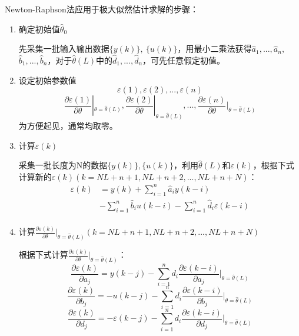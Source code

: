 \documentclass[UTF8, twocolumn]{article}
\begin{document}
Newton-Raphson法应用于极大似然估计求解的步骤：
\begin{enumerate}
    \item 确定初始值$\hat{\theta}_0$
    
    先采集一批输入输出数据$\{ y(k) \},\ \{ u(k) \}$，用最小二乘法获得$\hat{a}_1, ..., \hat{a}_n,$ $\hat{b}_1, ..., \hat{b}_n$，对于$\hat{\theta}(L)$中的$\hat{d}_1, ..., \hat{d}_n$，可先任意假定初值。

    \item 设定初始参数值
    \begin{equation*}
		\varepsilon(1), \varepsilon(2), ..., \varepsilon(n)
	\end{equation*} 
	\begin{equation*}
		\frac{\partial\varepsilon(1)}{\partial\theta}|_{\theta = \hat{\theta}(L)},\frac{\partial\varepsilon(2)}{\partial\theta}|_{\theta = \hat{\theta}(L)}, ..., \frac{\partial\varepsilon(n)}{\partial\theta}|_{\theta = \hat{\theta}(L)}
	\end{equation*} 
	为方便起见，通常均取零。
    
    \item 计算$\varepsilon(k)$
    
    采集一批长度为N的数据$\{ y(k) \}, \{ u(k) \}$，利用$\hat{\theta}(L)$和$\varepsilon(k)$，根据下式计算新的$\varepsilon(k)(k = NL + n + 1, NL + n + 2, ..., NL + n + N)$：
	\begin{align*}
		\varepsilon(k) &= y(k) + \sum_{i = 1}^n \hat{a}_iy(k - i) \\
		& - \sum_{i = 1}^n \hat{b}_iu(k - i) - \sum_{i = 1}^n \hat{d}_i\varepsilon(k - i) \\
	\end{align*}

    \item 计算$\frac{\partial \varepsilon(k)}{\partial \theta}|_{\theta = \hat{\theta}(L)}(k = NL + n + 1, NL + n + 2, ..., NL + n + N)$
    
    根据下式计算$\frac{\partial \varepsilon(k)}{\partial \theta}|_{\theta = \hat{\theta}(L)}$：
    \begin{equation*}
        \frac{\partial\varepsilon(k)}{\partial a_j} = y(k - j) - \sum_{i = 1}^n d_i \frac{\partial \varepsilon(k - i)}{\partial a_j}|_{\theta = \hat{\theta}(L)} 
    \end{equation*}
    \begin{equation*}
        \frac{\partial \varepsilon(k)}{\partial b_j} = -u(k - j) - \sum_{i = 1}^n d_i \frac{\partial \varepsilon(k - i)}{\partial b_j}|_{\theta = \hat{\theta}(L)}
    \end{equation*}
    \begin{equation*}
        \frac{\partial \varepsilon(k)}{\partial d_j} = -\varepsilon(k - j) - \sum_{i = 1}^n d_i \frac{\partial \varepsilon(k - i)}{\partial d_j}|_{\theta = \hat{\theta}(L)}
    \end{equation*}


\end{enumerate}
\end{document}
